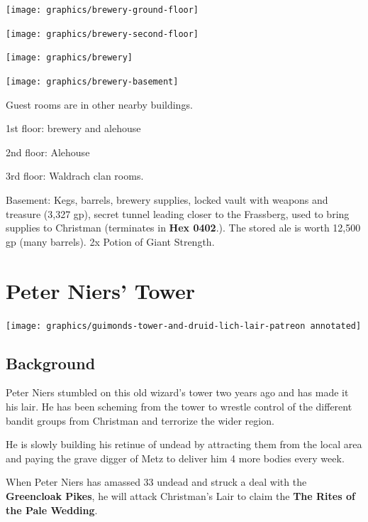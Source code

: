 \documentclass[
]{book}
\begin{document}
\begin{center}\texttt{[image: graphics/brewery-ground-floor]} \end{center}

\begin{center}\texttt{[image: graphics/brewery-second-floor]} \end{center}

\begin{center}\texttt{[image: graphics/brewery]} \end{center}

\begin{center}\texttt{[image: graphics/brewery-basement]} \end{center}

Guest rooms are in other nearby buildings.

1st floor: brewery and alehouse

2nd floor: Alehouse

3rd floor: Waldrach clan rooms.

Basement: Kegs, barrels, brewery supplies, locked vault with weapons and treasure (3,327 gp), secret tunnel leading closer to the Frassberg, used to bring supplies to Christman (terminates in \textbf{Hex 0402}.). The stored ale is worth 12,500 gp (many barrels). 2x Potion of Giant Strength.

\chapter{Peter Niers' Tower}\label{tower}

\begin{center}\texttt{[image: graphics/guimonds-tower-and-druid-lich-lair-patreon annotated]} \end{center}

\section{Background}\label{background}

Peter Niers stumbled on this old wizard's tower two years ago and has made it his lair. He has been scheming from the tower to wrestle control of the different bandit groups from Christman and terrorize the wider region.

He is slowly building his retinue of undead by attracting them from the local area and paying the grave digger of Metz to deliver him 4 more bodies every week.

When Peter Niers has amassed 33 undead and struck a deal with the \textbf{Greencloak Pikes}, he will attack Christman's Lair to claim the \textbf{The Rites of the Pale Wedding}.
\end{document}
